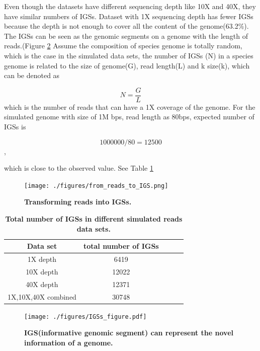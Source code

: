 Even though the datasets have different sequencing depth like 10X and 40X, 
they have similar numbers of IGSs. Dataset with 1X sequencing depth has fewer 
IGSs because the depth is not enough to cover all the content of the 
genome(63.2\%). The IGSs can be seen as the
genomic segments on a genome with the length of reads.(Figure \ref{fig:IGS}  
Assume the composition of species 
genome is totally random, which is the case in the simulated data sets, the 
number of IGSs (N) in a species genome is related to the size of genome(G), 
read length(L) and k size(k), which can be denoted as

\[N =\frac{G}{L}  \]
which is the number of reads that can have a 1X coverage of the genome.
For the simulated genome with size of 1M bps, read length as 80bps, expected 
number of IGSs is 

\[1000000/80 = 12500 \], 

which is close to the observed value. See Table \ref{table:IGSs}


\begin{figure}[!ht]
\centerline{\texttt{[image: ./figures/from\_reads\_to\_IGS.png]}}
\caption{\bf Transforming reads into IGSs.}
\label{fig:reads_to_IGS}
\end{figure}

\begin{table}[!ht]
\caption{
\bf{Total number of IGSs in different simulated reads data sets.}
}
\begin{tabular}{ |c | c |c| c|c| }
Data set & total number of IGSs \\
\hline 
1X depth                   & 6419  \\
10X depth                  & 12022  \\
40X depth                  & 12371 \\
1X,10X,40X combined        & 30748 \\
\end{tabular}
\begin{flushleft}
\end{flushleft}
\label{table:IGSs}
\end{table}


\begin{figure}[!ht]
\centerline{\texttt{[image: ./figures/IGSs\_figure.pdf]}}
\caption{\bf IGS(informative genomic segment) can represent the novel information of a genome.}
\label{fig:IGS}
\end{figure}





